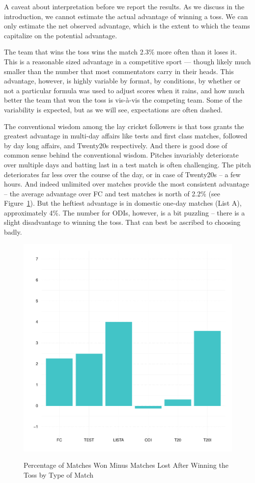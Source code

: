 \documentclass[12pt]{article}
\begin{document}
A caveat about interpretation before we report the results. As we discuss in the introduction, we cannot estimate the actual advantage of winning a toss. We can only estimate the net observed advantage, which is the extent to which the teams capitalize on the potential advantage. 

The team that wins the toss wins the match 2.3\% more often than it loses it. This is a reasonable sized advantage in a competitive sport --- though likely much smaller than the number that most commentators carry in their heads. This advantage, however, is highly variable by format, by conditions, by whether or not a particular formula was used to adjust scores when it rains, and how much better the team that won the toss is vis-\`{a}-vis the competing team. Some of the variability is expected, but as we will see, expectations are often dashed. 

The conventional wisdom among the lay cricket followers is that toss grants the greatest advantage in multi-day affairs like tests and first class matches, followed by day long affairs, and Twenty20s respectively. And there is good dose of common sense behind the conventional wisdom. Pitches invariably deteriorate over multiple days and batting last in a test match is often challenging. The pitch deteriorates far less over the course of the day, or in case of Twenty20s -- a few hours. And indeed unlimited over matches provide the most consistent advantage -- the average advantage over FC and test matches is north of 2.2\% (see Figure~\ref{fig:type}). But the heftiest advantage is in domestic one-day matches (List A), approximately 4\%. The number for ODIs, however, is a bit puzzling -- there is a slight disadvantage to winning the toss. That can best be ascribed to choosing badly.      

\begin{figure}[htbp]
\centering
\caption{Percentage of Matches Won Minus Matches Lost After Winning the Toss by Type of Match}
\includegraphics[scale=.85]{../figs/winbyType.pdf}
\label{fig:type}
\end{figure}
\end{document}

